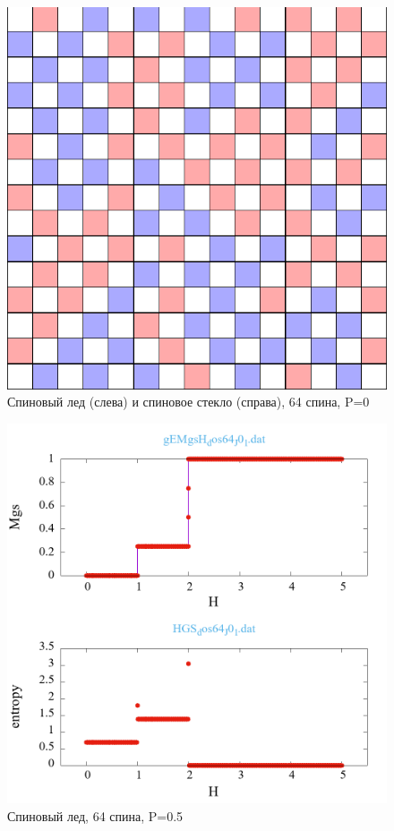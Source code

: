 \documentclass[utf8, babel, sor, jor, amsmath, amssymb, reprint]{elsarticle} %
\begin{document}
\begin{figure}[H]
\begin{minipage}[h]{0.45\linewidth}
		\includegraphics[width=1\linewidth]{cell_SG_64_J0_6.png}
	\end{minipage}
	\caption{Спиновый лед (слева) и спиновое стекло (справа), 64 спина, P=0}
	\label{fig:cell_SI_SG}
\end{figure}



\begin{figure}[H]
	\centering
	\includegraphics[width=1\textwidth]{_multiplot_SI64_J0_1.dat.png}
	\caption{Спиновый лед, 64 спина, P=0.5}
	\label{fig:_multiplot_SI64_J0_1.dat.png}
\end{figure}
\end{document}
